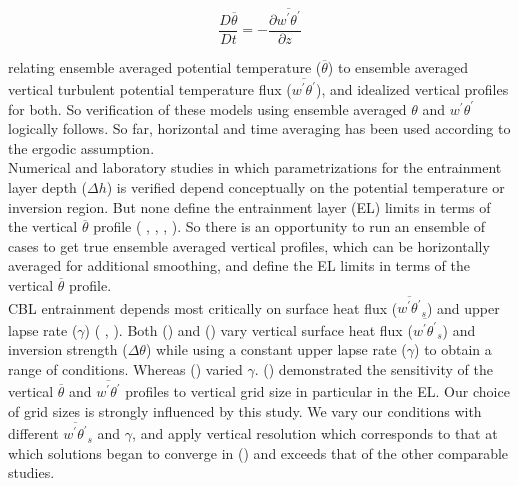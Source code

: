 \begin{equation}
\frac{D \overline{\theta}}{Dt} = -\frac{\partial \overline{w^{'}\theta^{'}}}{\partial z}
\end{equation}

relating ensemble averaged potential temperature ($\overline{\theta}$) to ensemble averaged vertical turbulent potential temperature flux ($\overline{w^{'}\theta^{'}}$), and idealized vertical profiles for both.  So verification of these models using ensemble averaged $\theta$ and $w^{'}\theta^{'}$ logically follows.  So far, horizontal and time averaging has been used according to the ergodic assumption.\\

Numerical and laboratory studies in which parametrizations for the entrainment layer depth ($\Delta h$) is verified 
depend conceptually on the potential temperature or inversion region.  But none define the entrainment layer (\acs{EL}) limits
in terms of the vertical $\overline{\theta}$ profile (\citeauthor{DearWill80} \cite{DearWill80}, \citeauthor{FedConzMir04} \cite{FedConzMir04}, 
\citeauthor{BrooksFowler2} \cite{BrooksFowler2}, \citeauthor{GarciaMellado} \cite{GarciaMellado}).  So there is an opportunity to run an ensemble of cases to get true ensemble averaged vertical profiles, which can be horizontally averaged for additional smoothing, and define the \acs{EL} limits in terms of the vertical $\overline{\theta}$ profile.\\

\acs{CBL} entrainment depends most critically on surface heat flux ($\overline{w^{'}\theta^{'}}_{s}$) and upper lapse rate ($\gamma$) 
(\citeauthor{Sorbjan} \cite{Sorbjan}, \citeauthor{FedConzMir04} \cite{FedConzMir04}).  Both \citeauthor{SullMoengStev} (\cite{SullMoengStev}) and \citeauthor{BrooksFowler2} (\cite{BrooksFowler2}) vary vertical surface heat flux ($\overline{w^{'}\theta^{'}}_{s}$) and inversion strength 
($\Delta \theta$) while using a constant upper lapse rate ($\gamma$) to obtain a range of conditions.  Whereas \citeauthor{FedConzMir04} 
\cite{FedConzMir04} (\cite{FedConzMir04}) varied $\gamma$. \citeauthor{SullPat} (\cite{SullPat}) demonstrated the sensitivity of the 
vertical $\overline{\theta}$ and $\overline{w^{'}\theta^{'}}$ profiles to vertical grid size in particular in the \acs{EL}.  Our choice of 
grid sizes is strongly influenced by this study.  We vary our conditions with different $\overline{w^{'}\theta^{'}}_{s}$ and $\gamma$, and 
apply vertical resolution which corresponds to that at which solutions began to converge in \citeauthor{SullPat} (\cite{SullPat})
and exceeds that of the other comparable studies.\\    


